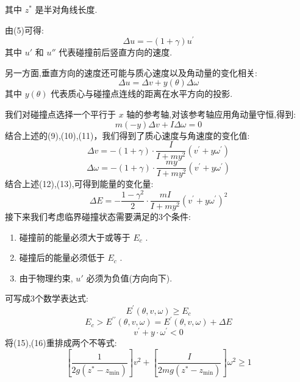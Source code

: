 \documentclass[UTF8]{gapd}
\begin{document}
其中  $z^*$  是半对角线长度.

由(5)可得:
\begin{equation}
\Delta u=-(1+\gamma) u^{\prime}
\end{equation}
其中   $u'$  和 $u''$    代表碰撞前后竖直方向的速度.

另一方面,垂直方向的速度还可能与质心速度以及角动量的变化相关:
\begin{equation}
\Delta u=\Delta v+y(\theta) \Delta \omega
\end{equation}
其中   $y(\theta)$    代表质心与碰撞点连线的距离在水平方向的投影.

我们对碰撞点选择一个平行于 $x$  轴的参考轴,对该参考轴应用角动量守恒,得到:
\begin{equation}
m\left( -y \right) \varDelta v+I\varDelta \omega =0
\end{equation}
结合上述的(9),(10),(11)，我们得到了质心速度与角速度的变化值:
\begin{equation}
\Delta v=-(1+\gamma) \cdot \frac{I}{I+m y^{2}}\left(v^{\prime}+y \omega^{\prime}\right)
\end{equation}
\begin{equation}
\Delta \omega=-(1+\gamma) \cdot \frac{m y}{I+m y^{2}}\left(v^{\prime}+y \omega^{\prime}\right)
\end{equation}
结合上述(12),(13),可得到能量的变化量:
\begin{equation}
\Delta E=-\frac{1-\gamma^{2}}{2} \cdot \frac{m I}{I+m y^{2}}\left(v^{\prime}+y \omega^{\prime}\right)^{2}
\end{equation}
接下来我们考虑临界碰撞状态需要满足的3个条件:
\begin{enumerate}
	\item 碰撞前的能量必须大于或等于  $E_{c}$   .
	\item 碰撞后的能量必须低于 $E_{c}$    .
	\item 由于物理约束,   $u'$ 必须为负值(方向向下).
\end{enumerate}
可写成3个数学表达式:
\begin{equation}
E^{\prime}(\theta, v, \omega) \geq E_{c}
\end{equation}
\begin{equation}
E_{c}>E^{\prime \prime}(\theta, v, \omega)=E^{\prime}(\theta, v, \omega)+\Delta E
\end{equation}
\begin{equation}
v^{\prime}+y \cdot \omega^{\prime}<0
\end{equation}
将(15),(16)重排成两个不等式:
\begin{equation}
\left[\frac{1}{2 g\left(z^{*}-z_{\min }\right)}\right] v^{2}+\left[\frac{I}{2 m g\left(z^{*}-z_{\min }\right)}\right] \omega^{2} \geq 1
\end{equation}
\end{document}
